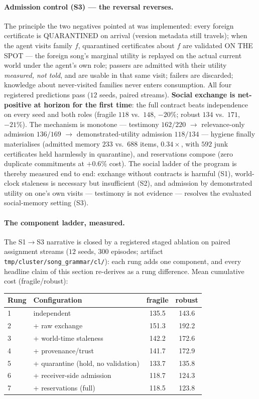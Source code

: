 \documentclass{article}
\begin{document}
\paragraph{Admission control (S3) --- the reversal reverses.} The
principle the two negatives pointed at was implemented: every foreign
certificate is QUARANTINED on arrival (version metadata still
travels); when the agent visits family $f$, quarantined certificates
about $f$ are validated ON THE SPOT --- the foreign song's marginal
utility is replayed on the actual current world under the agent's own
role; passers are admitted with their utility \emph{measured, not
told}, and are usable in that same visit; failers are discarded;
knowledge about never-visited families never enters consumption. All
four registered predictions pass ($12$ seeds, paired streams).
\textbf{Social exchange is net-positive at horizon for the first
time}: the full contract beats independence on every seed and both
roles (fragile $118$ vs.\ $148$, $-20\%$; robust $134$ vs.\ $171$,
$-21\%$). The mechanism is monotone --- testimony $162/220$ $\to$
relevance-only admission $136/169$ $\to$ demonstrated-utility
admission $118/134$ --- hygiene finally materialises (admitted
memory $233$ vs.\ $688$ items, $0.34\times$, with $592$ junk
certificates held harmlessly in quarantine), and reservations compose
(zero duplicate commitments at $+0.6\%$ cost). The social ladder of
the program is thereby measured end to end: exchange without
contracts is harmful (S1), world-clock staleness is necessary but
insufficient (S2), and admission by demonstrated utility on one's own
visits --- testimony is not evidence --- resolves the evaluated social-memory setting (S3).

\paragraph{The component ladder, measured.} The S1$\to$S3 narrative is
closed by a registered staged ablation on paired assignment streams
($12$ seeds, $300$ episodes; artifact
\texttt{tmp/cluster/song\_grammar/cl/}): each rung adds one component,
and every headline claim of this section re-derives as a rung
difference. Mean cumulative cost (fragile/robust):

\begin{center}
\small
\begin{tabular}{llcc}
\toprule
Rung & Configuration & fragile & robust \\
\midrule
1 & independent & 135.5 & 143.6 \\
2 & + raw exchange & 151.3 & 192.2 \\
3 & + world-time staleness & 142.2 & 172.6 \\
4 & + provenance/trust & 141.7 & 172.9 \\
5 & + quarantine (hold, no validation) & 133.7 & 135.8 \\
6 & + receiver-side admission & 118.7 & 124.3 \\
7 & + reservations (full) & 118.5 & 123.8 \\
\bottomrule
\end{tabular}
\end{center}
\end{document}
